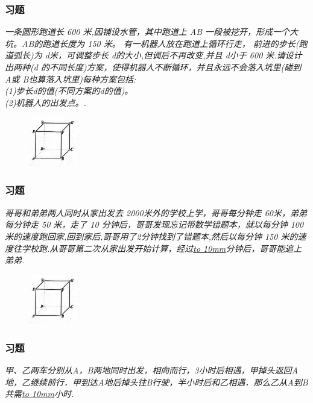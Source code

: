 \begin{frame}
    \frametitle{习题\theframecounter}
    \textit{一条圆形跑道长 600 米,因铺设水管，其中跑道上 AB 一段被挖开，形成一个大坑。AB的跑道长度为 150 米。 有一机器人放在跑道上循环行走， 前进的步长(跑道弧长)为 d米，可调整步长 d的大小,但调后不再改变,并且 d小于 600 米.请设计出两种(d 的不同长度)方案，使得机器人不断循环，并且永远不会落入坑里(碰到 A或 B也算落入坑里)每种方案包括:\\
    (1)步长d的值(不同方案的d的值)。\\
    (2)机器人的出发点。.}
    \begin{figure}[H] 
        \centering
        \includegraphics[width=0.2\textwidth]{./pics/Chapter_4/2.png}
    \end{figure}
\end{frame}


\begin{frame}
    \frametitle{习题\theframecounter}
    \textit{哥哥和弟弟两人同时从家出发去 2000米外的学校上学，哥哥每分钟走 60米，弟弟每分钟走 50 米，走了 10 分钟后，哥哥发现忘记带数学错题本，就以每分钟 100 米的速度跑回家,回到家后,哥哥用了2分钟找到了错题本,然后以每分钟 150 米的速度往学校跑.从哥哥第二次从家出发开始计算，经过\underline{\hbox to 10mm{}}分钟后，哥哥能追上弟弟.}
    \begin{figure}[H] 
        \centering
        \includegraphics[width=0.2\textwidth]{./pics/Chapter_4/2.png}
    \end{figure}
\end{frame}

\begin{frame}
    \frametitle{习题\theframecounter}
    \textit{甲、乙两车分别从A，B两地同时出发，相向而行，3小时后相遇，甲掉头返回A地，乙继续前行．甲到达A地后掉头往B行驶，半小时后和乙相遇．那么乙从A到B共需\underline{\hbox to 10mm{}}小时.}
\end{frame}


